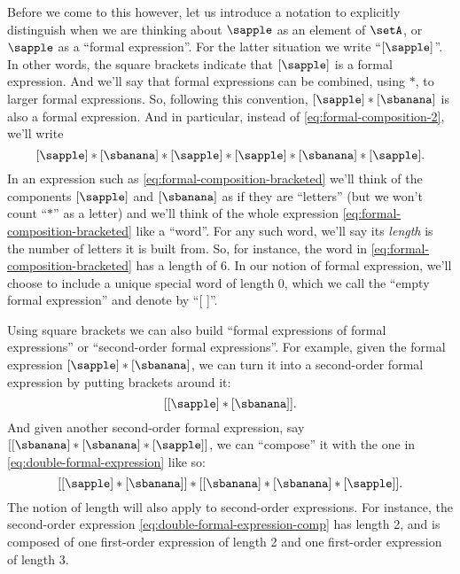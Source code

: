 Before we come to this however, let us introduce a notation to explicitly distinguish when we are thinking about $\sapple$ as an element of $\setA$, or $\sapple$ as a ``formal expression''.
For the latter situation we write ``$[\sapple]$''.
In other words, the square brackets indicate that $[\sapple]$ is a formal expression.
And we'll say that formal expressions can be combined, using $*$, to larger formal expressions.
So, following this convention, $[\sapple] * [\sbanana]$ is also a formal expression.
And in particular, instead of \cref{eq:formal-composition-2}, we'll write
\begin{equation}
    \label{eq:formal-composition-bracketed}
    [\sapple] * [\sbanana] * [\sapple] * [\sapple] * [\sbanana] * [\sapple].
\end{equation}
%
In an expression such as \cref{eq:formal-composition-bracketed} we'll think of the components $[\sapple]$ and $[\sbanana]$ as if they are ``letters'' (but we won't count ``$*$'' as a letter) and we'll think of the whole expression \cref{eq:formal-composition-bracketed} like a ``word''.
For any such word, we'll say its \emph{length} is the number of letters it is built from.
So, for instance, the word in \cref{eq:formal-composition-bracketed} has a length of $6$.
In our notion of formal expression, we'll choose to include a unique special word of length $0$, which we call the ``empty formal expression'' and denote by ``[ ]''.

Using square brackets we can also build ``formal expressions of formal expressions'' or ``second-order formal expressions''.
For example, given the formal expression $[\sapple] * [\sbanana]$, we can turn it into a second-order formal expression by putting brackets around it:
\begin{equation}
    \label{eq:double-formal-expression}
    [[\sapple] * [\sbanana]].
\end{equation}
And given another second-order formal expression, say $[[\sbanana] * [\sbanana] * [\sapple]]$, we can ``compose'' it with the one in \cref{eq:double-formal-expression} like so:
\begin{equation}
    \label{eq:double-formal-expression-comp}
    [[\sapple] * [\sbanana]] * [[\sbanana] * [\sbanana] * [\sapple]].
\end{equation}
The notion of length will also apply to second-order expressions.
For instance, the second-order expression \cref{eq:double-formal-expression-comp} has length 2, and is composed of one first-order expression of length 2 and one first-order expression of length 3.

